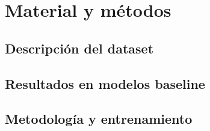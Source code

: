 %
\chapter{Material y métodos}
\label{sec::capitulo3}

\section{Descripción del dataset}

\section{Resultados en modelos baseline}

\section{Metodología y entrenamiento}
